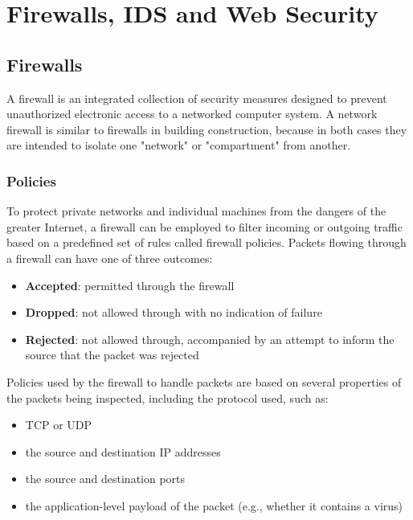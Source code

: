 \chapter{Firewalls, IDS and Web Security}
\section{Firewalls}
A firewall is an integrated collection of security measures designed to prevent unauthorized electronic access to a networked computer system. A network firewall is similar to firewalls in building construction, because in both cases they are intended to isolate one "network" or "compartment" from another.
\subsection{Policies}
To protect private networks and individual machines from the dangers of the greater Internet, a firewall can be employed to filter incoming or outgoing traffic based on a predefined set of rules called firewall policies.
Packets flowing through a firewall can have one of three outcomes:
\begin{itemize}
\item \textbf{Accepted}: permitted through the firewall
\item \textbf{Dropped}: not allowed through with no indication of failure
\item  \textbf{Rejected}: not allowed through, accompanied by an attempt to inform the source that the packet was rejected
\end{itemize}
Policies used by the firewall to handle packets are based on several properties of the packets being inspected, including the protocol used, such as:
\begin{itemize}
\item TCP or UDP
\item the source and destination IP addresses
\item the source and destination ports
\item the application-level payload of the packet (e.g., whether it contains a virus)
\end{itemize}
